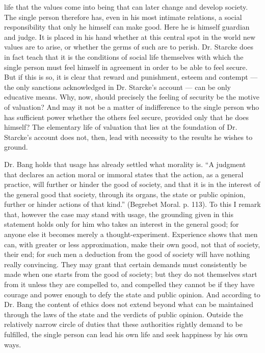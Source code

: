 \documentclass[12pt,a4paper,openany]{book}
\newcommand{\opage}[1]{\marginnote{\footnotesize\textit{[#1]}}}
\begin{document}
life that the values come into being that can later change and develop society. The single person
therefore has, even in his most intimate relations, a social responsibility that only he himself can
make good. Here he is himself guardian and judge. It is placed in his hand whether at this central
spot in the world new values are to arise, or whether the germs of such are to perish. Dr. Starcke
does in fact teach that it is the conditions of social life themselves with which the single person
must feel himself in agreement in order to be able to feel secure. But if this is so, it is clear that
reward and punishment, esteem and contempt --- the only sanctions acknowledged in Dr. Starcke's
account --- can be only educative means. Why, now, should precisely the feeling of security be the
motive of valuation? And may it not be a matter of indifference to the single person who has
sufficient power whether the others feel secure, provided only that he does himself? The elementary
life of valuation that lies at the foundation of Dr. Starcke's account does not, then, lead with
necessity to the results he wishes to ground.

Dr. Bang holds that usage has already settled what morality is. ``A judgment that declares an action
moral or immoral states that the action, as a general practice, will further or hinder the good of
society, and that it is in the interest of the general good that society, through its organs, the state
or public opinion, further or hinder actions of that kind.'' (Begrebet Moral. p. 113). To this I
remark that,
\opage{71}however the case may stand with usage, the grounding given in this statement holds only for him who
takes an interest in the general good; for anyone else it becomes merely a thought-experiment.
Experience shows that men can, with greater or less approximation, make their own good, not that of
society, their end; for such men a deduction from the good of society will have nothing really
convincing. They may grant that certain demands must consistently be made when one starts from the good
of society; but they do not themselves start from it unless they are compelled to, and compelled they
cannot be if they have courage and power enough to defy the state and public opinion. And according to
Dr. Bang the content of ethics does not extend beyond what can be maintained through the laws of the
state and the verdicts of public opinion. Outside the relatively narrow circle of duties that these
authorities rightly demand to be fulfilled, the single person can lead his own life and seek happiness
by his own ways.
\end{document}
